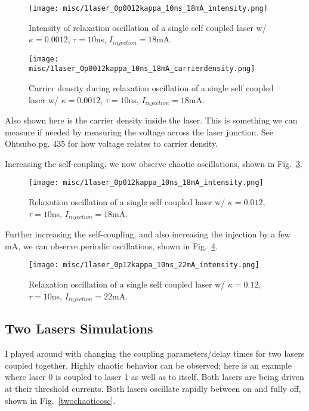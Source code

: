 \documentclass[11pt,letterpaper]{article}
\begin{document}
\begin{figure}[H]
\centering
\texttt{[image: misc/1laser\_0p0012kappa\_10ns\_18mA\_intensity.png]}
\caption{Intensity of relaxation oscillation of a single self coupled laser w/ $\kappa = 0.0012$, $\tau = 10$ns, $I_{injection}=18$mA.\label{relaxationosc}}
\end{figure}

\begin{figure}[H]
\centering
\texttt{[image: misc/1laser\_0p0012kappa\_10ns\_18mA\_carrierdensity.png]}
\caption{Carrier density during relaxation oscillation of a single self coupled laser w/ $\kappa = 0.0012$, $\tau = 10$ns, $I_{injection}=18$mA.\label{carrierdensityrelaxationosc}}
\end{figure}

Also shown here is the carrier density inside the laser. This is something we can measure if needed by measuring the voltage across the laser junction. See Ohtsubo pg. 435 for how voltage relates to carrier density.

Increasing the self-coupling, we now observe chaotic oscillations, shown in Fig.~\ref{chaoticosc}.

\begin{figure}[H]
\centering
\texttt{[image: misc/1laser\_0p012kappa\_10ns\_18mA\_intensity.png]}
\caption{Relaxation oscillation of a single self coupled laser w/ $\kappa = 0.012$, $\tau = 10$ns, $I_{injection}=18$mA.\label{chaoticosc}}
\end{figure}

Further increasing the self-coupling, and also increasing the injection by a few mA, we can observe periodic oscillations, shown in Fig.~\ref{periodicosc}.

\begin{figure}[H]
\centering
\texttt{[image: misc/1laser\_0p12kappa\_10ns\_22mA\_intensity.png]}
\caption{Relaxation oscillation of a single self coupled laser w/ $\kappa = 0.12$, $\tau = 10$ns, $I_{injection}=22$mA.\label{periodicosc}}
\end{figure}

\subsection{Two Lasers Simulations}

I played around with changing the coupling parameters/delay times for two lasers coupled together. Highly chaotic behavior can be observed; here is an example where laser 0 is coupled to laser 1 as well as to itself. Both lasers are being driven at their threshold currents. Both lasers oscillate rapidly between on and fully off, shown in Fig.~\ref{twochaoticosc}.
\end{document}
